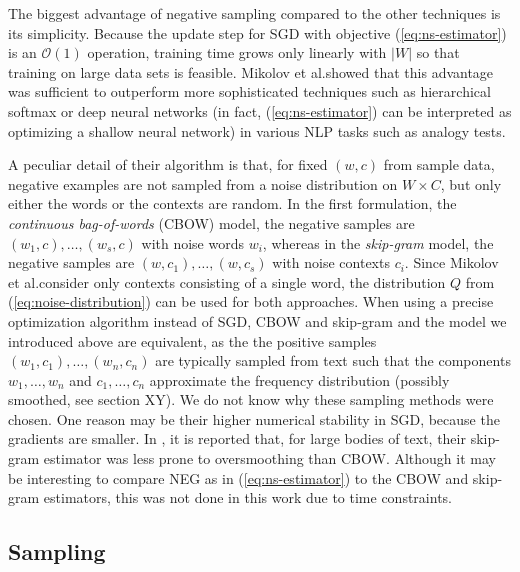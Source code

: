 \documentclass{amsart}
\theoremstyle{plain}
\theoremstyle{definition}
\begin{document}
The biggest advantage of negative sampling compared to the other techniques is its simplicity.
Because the update step for SGD with objective (\ref{eq:ns-estimator}) is an $\mathcal{O}(1)$ operation, training time grows only linearly with $|W|$ so that training on large data sets is feasible.
Mikolov et al.\@ showed that this advantage was sufficient to outperform more sophisticated techniques such as hierarchical softmax or deep neural networks (in fact, (\ref{eq:ns-estimator}) can be interpreted as optimizing a shallow neural network) in various NLP tasks such as analogy tests.

A peculiar detail of their algorithm is that, for fixed $(w, c)$ from sample data, negative examples are not sampled from a noise distribution on $W \times C$, but only either the words or the contexts are random.
In the first formulation, the \emph{continuous bag-of-words} (CBOW) model, the negative samples are $(w_1, c), \dots, (w_s, c)$ with noise words $w_i$, whereas in the \emph{skip-gram} model, the negative samples are $(w, c_1), \dots, (w, c_s)$ with noise contexts $c_i$.
Since Mikolov et al.\@ consider only contexts consisting of a single word, the distribution $Q$ from (\ref{eq:noise-distribution}) can be used for both approaches.
When using a precise optimization algorithm instead of SGD, CBOW and skip-gram and the model we introduced above are equivalent, as the the positive samples $(w_1, c_1), \dots, (w_n, c_n)$ are typically sampled from text such that the components $w_1, \dots, w_n$ and $c_1, \dots, c_n$ approximate the frequency distribution (possibly smoothed, see section XY).
We do not know why these sampling methods were chosen.
One reason may be their higher numerical stability in SGD, because the gradients are smaller.
In \cite{DBLP:journals/corr/MikolovSCCD13}, it is reported that, for large bodies of text, their skip-gram estimator was less prone to oversmoothing than CBOW.
Although it may be interesting to compare NEG as in (\ref{eq:ns-estimator}) to the CBOW and skip-gram estimators, this was not done in this work due to time constraints.

\subsection{Sampling}
\end{document}
